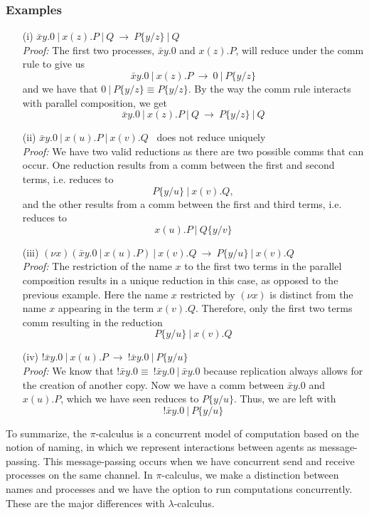 \documentclass[12pt]{article}
\numberwithin{equation}{section}
\begin{document}
\subsubsection{Examples}
\begin{enumerate}
\item[(i)] $\bar{ x} y .0 \ | \ x(z).P \ | \ Q \ \rightarrow \ P\{ y / z \} \ | \ Q$ \\
\emph{Proof:} The first two processes, $\bar{ x} y .0$ and $x(z).P$, will reduce under the comm rule to give us 
\[ \bar{ x} y .0 \ | \ x(z).P \ \rightarrow \ 0 \ | \ P \{ y/z \} \]
and we have that $0 \ | \ P \{ y/z \} \equiv P\{ y / z \}$. By the way the comm rule interacts with parallel composition, we get 
\[ \bar{ x} y .0 \ | \ x(z).P \ | \ Q \ \rightarrow \ P\{ y / z \} \ | \ Q \]

\item[(ii)] $\bar{ x} y .0 \ | \ x(u).P \ | \ x(v).Q$ \ does not reduce uniquely \\
\emph{Proof:} We have two valid reductions as there are two possible comms that can occur. One reduction results from a comm between the first and second terms, i.e. reduces to
\[ P\{ y / u \} \ | \ x(v).Q, \]
and the other results from a comm between the first and third terms, i.e. reduces to
\[ x(u).P \ | \ Q\{ y / v \} \]

\item[(iii)] $(\nu x) \left( \bar{x} y .0 \ | \ x(u).P \right) \ | \ x(v).Q \ \rightarrow \ P\{  y / u \} \ | \ x(v).Q$ \\
\emph{Proof:} The restriction of the name $x$ to the first two terms in the parallel composition results in a unique reduction in this case, as opposed to the previous example. Here the name $x$ restricted by $(\nu x)$ is distinct from the name $x$ appearing in the term $x(v).Q$. Therefore, only the first two terms comm resulting in the reduction
\[ P\{  y / u \} \ | \ x(v).Q \]

\item[(iv)] $! \bar{x} y .0 \ | \ x(u).P \ \rightarrow \ ! \bar{x} y .0 \ | \  P\{ y / u \}$ \\
\emph{Proof:} We know that $! \bar{x} y .0 \equiv \ ! \bar{x} y .0 \ | \ \bar{x} y .0$ because replication always allows for the creation of another copy. Now we have a comm between $\bar{x} y .0$ and $x(u).P$, which we have seen reduces to $P\{ y / u \}$. Thus, we are left with 
\[ ! \bar{x} y .0 \ | \  P\{ y / u \} \]
\end{enumerate}

To summarize, the $\pi$-calculus is a concurrent model of computation based on the notion of naming, in which we represent interactions between agents as message-passing. This message-passing occurs when we have concurrent send and receive processes on the same channel. In $\pi$-calculus, we make a distinction between names and processes and we have the option to run computations concurrently. These are the major differences with $\lambda$-calculus. \\
\end{document}
